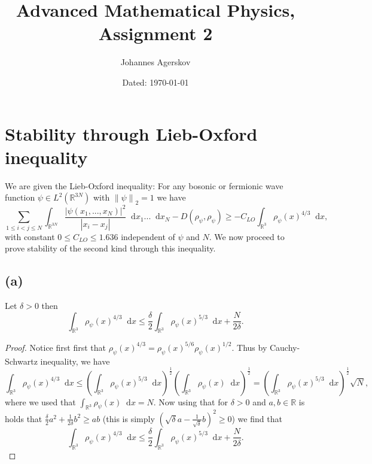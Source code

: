\documentclass[a4paper,11pt]{article}
\author{Johannes Agerskov}
\date{Dated: \today}
\title{Advanced Mathematical Physics, Assignment 2}
\newcommand{\norm}[1]{\left\lVert #1 \right\rVert}
\newcommand{\abs}[1]{\left\lvert #1 \right\rvert}
\newcommand*\diff{\mathop{}\!\mathrm{d}}
\newcommand{\R}{\mathbb{R}}
\numberwithin{equation}{section}
\begin{document}
	\maketitle

\section{Stability through Lieb-Oxford inequality}
We are given the Lieb-Oxford inequality: For any bosonic or fermionic wave function $ \psi\in L^2(\R^{3N}) $ with $ \norm{\psi}_2=1 $ we have \begin{equation}
\sum_{1\leq i< j\leq N}\int_{\R^{3N}}\frac{\abs{\psi(x_1,...,x_N)}^2}{\abs{x_i-x_j}}\diff x_1...\diff x_N-D(\rho_\psi,\rho_\psi)\geq-C_{LO}\int_{\R^3}\rho_\psi(x)^{4/3}\diff x,
\end{equation}  
with constant $ 0\leq C_{LO}\leq1.636 $ independent of $ \psi $ and $ N $. We now proceed to prove stability of the second kind through this inequality.
\subsection*{(a)}
Let $ \delta>0 $ then \begin{equation}
\int_{\R^3}\rho_\psi(x)^{4/3}\diff x\leq\frac{\delta}{2}\int_{\R^3}\rho_{\psi}(x)^{5/3}\diff x+\frac{N}{2\delta}.
\end{equation}
\begin{proof}
	Notice first first that $ \rho_{\psi}(x)^{4/3}=\rho_{\psi}(x)^{5/6}\rho_{\psi}(x)^{1/2} $. Thus by Cauchy-Schwartz inequality, we have \begin{equation}
	\int_{\R^3}\rho_\psi(x)^{4/3}\diff x\leq\left(\int_{\R^3}\rho_\psi(x)^{5/3}\diff x\right)^{\frac{1}{2}}\left(\int_{\R^3}\rho_\psi(x)\diff x\right)^{\frac{1}{2}}=\left(\int_{\R^3}\rho_\psi(x)^{5/3}\diff x\right)^{\frac{1}{2}}\sqrt{N},
	\end{equation}
	where we used that $ \int_{\R^3}\rho_\psi(x)\diff x=N $. Now using that for $ \delta>0 $ and $ a,b\in \R $ is holds that $ \frac{\delta}{2}a^2+\frac{1}{2\delta}b^2\geq ab $ (this is simply $ (\sqrt{\delta} a-\frac{1}{\sqrt{\delta}}b)^2\geq0 $) we find that \begin{equation}
	\int_{\R^3}\rho_\psi(x)^{4/3}\diff x\leq\frac{\delta}{2}\int_{\R^3}\rho_\psi(x)^{5/3}\diff x+\frac{N}{2\delta}.
	\end{equation}
\end{proof}
\end{document}
